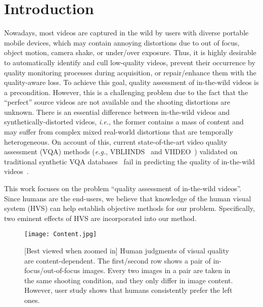 \documentclass[sigconf]{acmart}
\begin{document}

\maketitle

\section{Introduction}
\label{sec:introduction}
Nowadays, most videos are captured in the wild by users with diverse portable mobile devices, which may contain annoying distortions due to out of focus, object motion, camera shake, or under/over exposure. 
Thus, it is highly desirable to automatically identify and cull low-quality videos, prevent their occurrence by quality monitoring processes during acquisition, or repair/enhance them with the quality-aware loss.
To achieve this goal, quality assessment of in-the-wild videos is a precondition.
However, this is a challenging problem due to the fact that the ``perfect'' source videos are not available and the shooting distortions are unknown. 
There is an essential difference between in-the-wild videos and synthetically-distorted videos, \textit{i.e.}, the former contains a mass of content and may suffer from complex mixed real-world distortions that are temporally heterogeneous.
On account of this, current state-of-the-art video quality assessment (VQA) methods (\textit{e.g.}, VBLIINDS~\cite{saad2014blind} and VIIDEO~\cite{mittal2016completely}) validated on traditional synthetic VQA databases~\cite{seshadrinathan2010study, moorthy2012video} fail in predicting the quality of in-the-wild videos~\cite{men2017empirical,ghadiyaram2018capture, nuutinen2016cvd2014,sinno2018large}. 

This work focuses on the problem ``quality assessment of in-the-wild videos''. 
Since humans are the end-users, we believe that knowledge of the human visual system (HVS) can help establish objective methods for our problem. 
Specifically, two eminent effects of HVS are incorporated into our method.

\begin{figure}
\begin{center}
  \texttt{[image: Content.jpg]}\label{fig:P1}
\end{center}
  \caption{[Best viewed when zoomed in] Human judgments of visual quality are content-dependent. The first/second row shows a pair of in-focus/out-of-focus images. Every two images in a pair are taken in the same shooting condition, and they only differ in image content. However, user study shows that humans consistently prefer the left ones.} \Description{}
  \label{fig:video content}
\end{figure}
\end{document}
